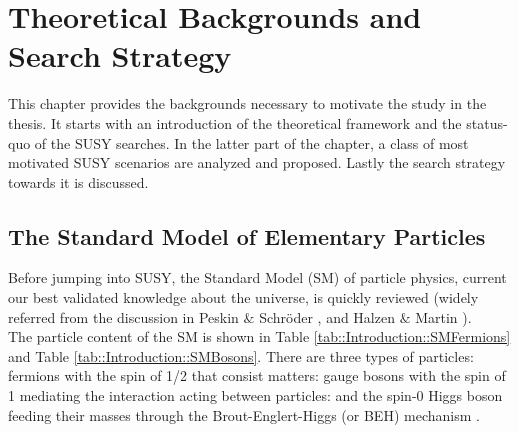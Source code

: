 \chapter{Theoretical Backgrounds and Search Strategy} \label{sec::Introduction}
This chapter provides the backgrounds necessary to motivate the study in the thesis.
It starts with an introduction of the theoretical framework and the status-quo of the SUSY searches.
In the latter part of the chapter, a class of most motivated SUSY scenarios are analyzed and proposed.
Lastly the search strategy towards it is discussed.
%

\section{The Standard Model of Elementary Particles}
Before jumping into SUSY, the Standard Model (SM) of particle physics, current our best validated knowledge about the universe, is quickly reviewed (widely referred from the discussion in Peskin $\&$ Schr{\"{o}}der \cite{PeskinSchroeder}, and Halzen $\&$ Martin \cite{HalzenMartin}). \\

The particle content of the SM is shown in Table \ref{tab::Introduction::SMFermions} and Table \ref{tab::Introduction::SMBosons}. 
There are three types of particles: fermions with the spin of 1/2 that consist matters: 
gauge bosons with the spin of 1 mediating the interaction acting between particles: 
and the spin-0 Higgs boson feeding their masses through the Brout-Englert-Higgs (or BEH) mechanism \cite{SSBBroutEnglert,SSBHiggs}.  \\

